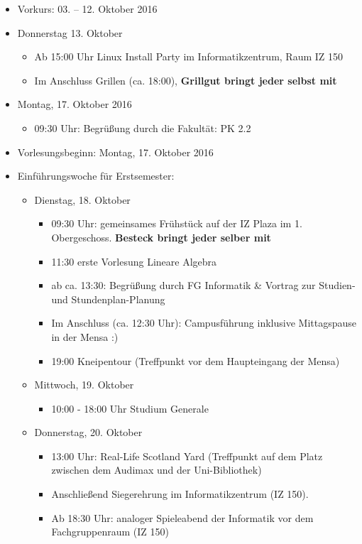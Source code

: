 \begin{itemize}
	\item Vorkurs: 03. – 12. Oktober 2016
	
	\item Donnerstag 13. Oktober
	\begin{itemize}
		\item Ab 15:00 Uhr Linux Install Party im Informatikzentrum, Raum IZ 150
		\item Im Anschluss Grillen (ca. 18:00), \textbf{Grillgut bringt jeder selbst mit}
	\end{itemize}

	\item Montag, 17. Oktober 2016
	\begin{itemize}
		\item 09:30 Uhr: Begrüßung durch die Fakultät: PK 2.2
	\end{itemize}

	\item Vorlesungsbeginn: Montag, 17. Oktober 2016

	\item Einführungswoche für Erstsemester:
	\begin{itemize}
		\item Dienstag, 18. Oktober
		\begin{itemize}
			\item 09:30 Uhr: gemeinsames Frühstück auf der IZ Plaza im 1. Obergeschoss. \textbf{Besteck bringt jeder selber mit}
			\item 11:30 erste Vorlesung Lineare Algebra
			\item ab ca. 13:30: Begrüßung durch FG Informatik \& Vortrag zur Studien- und Stundenplan-Planung
			\item Im Anschluss (ca. 12:30 Uhr): Campusführung inklusive Mittagspause in der Mensa :)
			\item 19:00 Kneipentour (Treffpunkt vor dem Haupteingang der Mensa)
		\end{itemize}

		\item Mittwoch, 19. Oktober
		\begin{itemize}
			\item 10:00 - 18:00 Uhr Studium Generale
		\end{itemize}

		\item Donnerstag, 20. Oktober
		\begin{itemize}
			\item 13:00 Uhr: Real-Life Scotland Yard (Treffpunkt auf dem Platz zwischen dem Audimax und der Uni-Bibliothek)
			\item Anschließend Siegerehrung im Informatikzentrum (IZ 150).
			\item Ab 18:30 Uhr: analoger Spieleabend der Informatik vor dem Fachgruppenraum (IZ 150)
		\end{itemize}
	\end{itemize}


\end{itemize}
